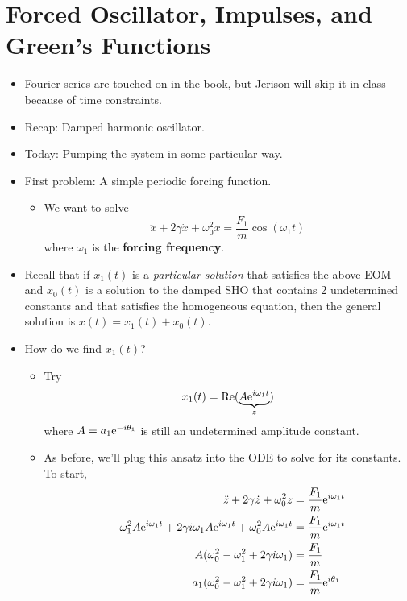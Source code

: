 \documentclass[../notes.tex]{subfiles}
\begin{document}
\section{Forced Oscillator, Impulses, and Green's Functions}
\begin{itemize}
    \item {}Fourier series are touched on in the book, but Jerison will skip it in class because of time constraints.
    \item Recap: Damped harmonic oscillator.
    \item Today: Pumping the system in some particular way.
    \item First problem: A simple periodic forcing function.
    \begin{itemize}
        \item We want to solve
        \begin{equation*}
            \ddot{x}+2\gamma\dot{x}+\omega_0^2x = \frac{F_1}{m}\cos(\omega_1t)
        \end{equation*}
        where $\omega_1$ is the \textbf{forcing frequency}.
    \end{itemize}
    \item Recall that if $x_1(t)$ is a \emph{particular solution} that satisfies the above EOM and $x_0(t)$ is a solution to the damped SHO that contains 2 undetermined constants and that satisfies the homogeneous equation, then the general solution is $x(t)=x_1(t)+x_0(t)$.
    \item How do we find $x_1(t)$?
    \begin{itemize}
        \item Try
        \begin{equation*}
            x_1(t) = \re(\underbrace{A\e[i\omega_1t]}_z)
        \end{equation*}
        where $A=a_1\e[-i\theta_1]$ is still an undetermined amplitude constant.
        \item As before, we'll plug this ansatz into the ODE to solve for its constants. To start,
        \begin{align*}
            \ddot{z}+2\gamma\dot{z}+\omega_0^2z &= \frac{F_1}{m}\e[i\omega_1t]\\
            -\omega_1^2A\e[i\omega_1t]+2\gamma i\omega_1A\e[i\omega_1t]+\omega_0^2A\e[i\omega_1t] &= \frac{F_1}{m}\e[i\omega_1t]\\
            A(\omega_0^2-\omega_1^2+2\gamma i\omega_1) &= \frac{F_1}{m}\\
            a_1(\omega_0^2-\omega_1^2+2\gamma i\omega_1) &= \frac{F_1}{m}\e[i\theta_1]\\

\end{align*}
\end{itemize}
\end{itemize}
\end{document}
